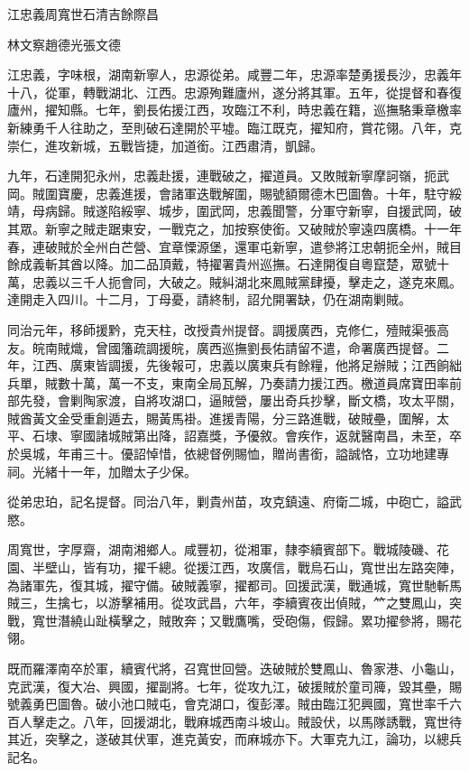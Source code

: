 
\begin{pinyinscope}
江忠義周寬世石清吉餘際昌

林文察趙德光張文德

江忠義，字味根，湖南新寧人，忠源從弟。咸豐二年，忠源率楚勇援長沙，忠義年十八，從軍，轉戰湖北、江西。忠源殉難廬州，遂分將其軍。五年，從提督和春復廬州，擢知縣。七年，劉長佑援江西，攻臨江不利，時忠義在籍，巡撫駱秉章檄率新練勇千人往助之，至則破石達開於平墟。臨江既克，擢知府，賞花翎。八年，克崇仁，進攻新城，五戰皆捷，加道銜。江西肅清，凱歸。

九年，石達開犯永州，忠義赴援，連戰破之，擢道員。又敗賊新寧摩訶嶺，扼武岡。賊圍寶慶，忠義進援，會諸軍迭戰解圍，賜號額爾德木巴圖魯。十年，駐守綏靖，母病歸。賊遂陷綏寧、城步，圍武岡，忠義聞警，分軍守新寧，自援武岡，破其眾。新寧之賊走踞東安，一戰克之，加按察使銜。又破賊於寧遠四廣橋。十一年春，連破賊於全州白芒營、宜章慄源堡，還軍屯新寧，遣參將江忠朝扼全州，賊目餘成義斬其酋以降。加二品頂戴，特擢署貴州巡撫。石達開復自粵竄楚，眾號十萬，忠義以三千人扼會同，大破之。賊糾湖北來鳳賊黨肆擾，擊走之，遂克來鳳。達開走入四川。十二月，丁母憂，請終制，詔允開署缺，仍在湖南剿賊。

同治元年，移師援黔，克天柱，改授貴州提督。調援廣西，克修仁，殪賊渠張高友。皖南賊熾，曾國籓疏調援皖，廣西巡撫劉長佑請留不遣，命署廣西提督。二年，江西、廣東皆調援，先後報可，忠義以廣東兵有餘糧，他將足辦賊；江西餉絀兵單，賊數十萬，萬一不支，東南全局瓦解，乃奏請力援江西。檄道員席寶田率前部先發，會剿陶家渡，自將攻湖口，逼賊營，屢出奇兵抄擊，斷文橋，攻太平關，賊酋黃文金受重創遁去，賜黃馬褂。進援青陽，分三路進戰，破賊壘，圍解，太平、石埭、寧國諸城賊第出降，詔嘉獎，予優敘。會疾作，返就醫南昌，未至，卒於吳城，年甫三十。優詔悼惜，依總督例賜恤，贈尚書銜，謚誠恪，立功地建專祠。光緒十一年，加贈太子少保。

從弟忠珀，記名提督。同治八年，剿貴州苗，攻克鎮遠、府衛二城，中砲亡，謚武愍。

周寬世，字厚齋，湖南湘鄉人。咸豐初，從湘軍，隸李續賓部下。戰城陵磯、花園、半壁山，皆有功，擢千總。從援江西，攻廣信，戰烏石山，寬世出左路突陣，為諸軍先，復其城，擢守備。破賊義寧，擢都司。回援武漢，戰通城，寬世馳斬馬賊三，生擒七，以游擊補用。從攻武昌，六年，李續賓夜出偵賊，𥫗之雙鳳山，突戰，寬世潛繞山趾橫擊之，賊敗奔；又戰鷹嘴，受砲傷，假歸。累功擢參將，賜花翎。

既而羅澤南卒於軍，續賓代將，召寬世回營。迭破賊於雙鳳山、魯家港、小龜山，克武漢，復大冶、興國，擢副將。七年，從攻九江，破援賊於童司簰，毀其壘，賜號義勇巴圖魯。破小池口賊屯，會克湖口，復彭澤。賊由臨江犯興國，寬世率千六百人擊走之。八年，回援湖北，戰麻城西南斗坡山。賊設伏，以馬隊誘戰，寬世待其近，突擊之，遂破其伏軍，進克黃安，而麻城亦下。大軍克九江，論功，以總兵記名。


\end{pinyinscope}

